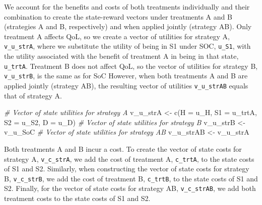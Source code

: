 \documentclass[
]{article}
\newenvironment{Shaded}{\begin{snugshade}}{\end{snugshade}}
\newcommand{\AttributeTok}[1]{\textcolor[rgb]{0.77,0.63,0.00}{#1}}
\newcommand{\CommentTok}[1]{\textcolor[rgb]{0.56,0.35,0.01}{\textit{#1}}}
\newcommand{\FunctionTok}[1]{\textcolor[rgb]{0.00,0.00,0.00}{#1}}
\newcommand{\NormalTok}[1]{#1}
\newcommand{\OtherTok}[1]{\textcolor[rgb]{0.56,0.35,0.01}{#1}}
\begin{document}
We account for the benefits and costs of both treatments individually and their combination to create the state-reward vectors under treatments A and B (strategies A and B, respectively) and when applied jointly (strategy AB). Only treatment A affects QoL, so we create a vector of utilities for strategy A, \texttt{v\_u\_strA}, where we substitute the utility of being in S1 under SOC, \texttt{u\_S1}, with the utility associated with the benefit of treatment A in being in that state, \texttt{u\_trtA}. Treatment B does not affect QoL, so the vector of utilities for strategy B, \texttt{v\_u\_strB}, is the same as for SoC However, when both treatments A and B are applied jointly (strategy AB), the resulting vector of utilities \texttt{v\_u\_strAB} equals that of strategy A.

\begin{Shaded}
\begin{Highlighting}[]
\CommentTok{\# Vector of state utilities for strategy A}
\NormalTok{v\_u\_strA }\OtherTok{\textless{}{-}} \FunctionTok{c}\NormalTok{(}\AttributeTok{H =}\NormalTok{ u\_H, }\AttributeTok{S1 =}\NormalTok{ u\_trtA, }\AttributeTok{S2 =}\NormalTok{ u\_S2, }\AttributeTok{D =}\NormalTok{ u\_D)}
\CommentTok{\# Vector of state utilities for strategy B}
\NormalTok{v\_u\_strB }\OtherTok{\textless{}{-}}\NormalTok{ v\_u\_SoC}
\CommentTok{\# Vector of state utilities for strategy AB}
\NormalTok{v\_u\_strAB }\OtherTok{\textless{}{-}}\NormalTok{ v\_u\_strA}
\end{Highlighting}
\end{Shaded}

Both treatments A and B incur a cost. To create the vector of state costs for strategy A, \texttt{v\_c\_strA}, we add the cost of treatment A, \texttt{c\_trtA}, to the state costs of S1 and S2. Similarly, when constructing the vector of state costs for strategy B, \texttt{v\_c\_strB}, we add the cost of treatment B, \texttt{c\_trtB}, to the state costs of S1 and S2. Finally, for the vector of state costs for strategy AB, \texttt{v\_c\_strAB}, we add both treatment costs to the state costs of S1 and S2.
\end{document}
